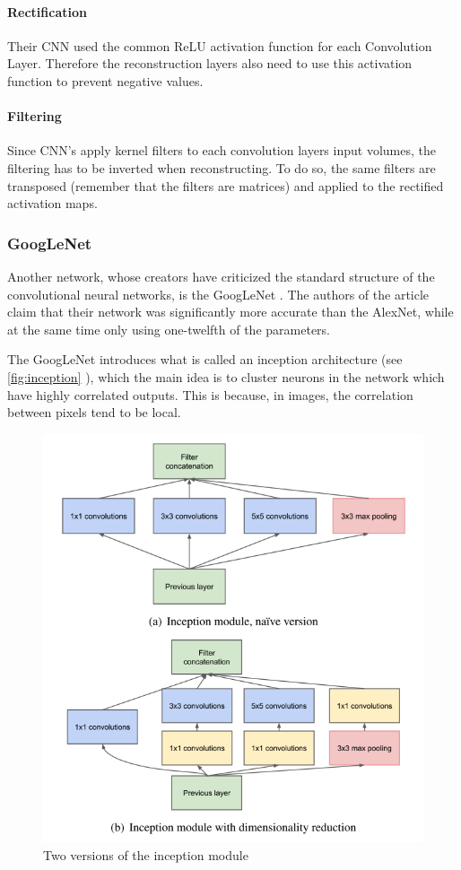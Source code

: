 \paragraph{Rectification}
Their CNN used the common ReLU activation function for each Convolution Layer. Therefore the reconstruction layers also need to use this activation function to prevent negative values.

\paragraph{Filtering}
Since CNN's apply kernel filters to each convolution layers input volumes, the filtering has to be inverted when reconstructing. To do so, the same filters are transposed (remember that the filters are matrices) and applied to the rectified activation maps.

\subsubsection{GoogLeNet}
Another network, whose creators have criticized the standard structure of the convolutional neural networks, is the GoogLeNet \citep{Szegedy2014}. The authors of the article claim that their network was significantly more accurate than the AlexNet, while at the same time only using one-twelfth of the parameters.

The GoogLeNet introduces what is called an inception architecture (see \autoref{fig:inception} ), which the main idea is to cluster neurons in the network which have highly correlated outputs. This is because, in images, the correlation between pixels tend to be local. 

\begin{figure}[!h]
	\centering
	\includegraphics[scale=0.5]{fig/inception_layer.png}
	\caption{Two versions of the inception module \citep{Szegedy2014}}
	\label{fig:inception}
\end{figure}

